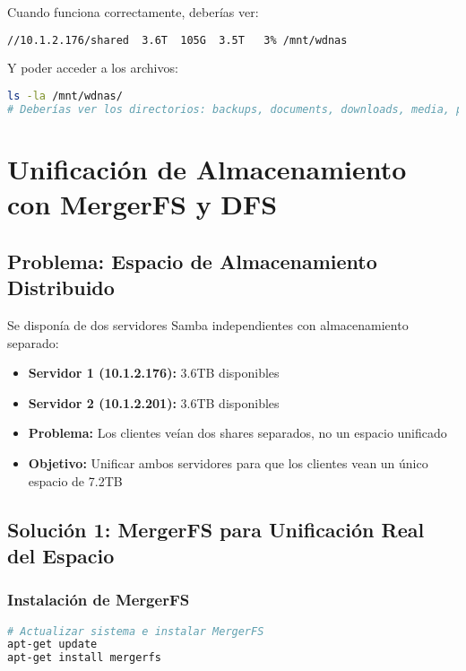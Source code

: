 \documentclass[12pt, a4paper]{article}
\begin{document}
Cuando funciona correctamente, deberías ver:
\begin{lstlisting}[language=bash, caption=Salida exitosa del montaje]
//10.1.2.176/shared  3.6T  105G  3.5T   3% /mnt/wdnas
\end{lstlisting}

Y poder acceder a los archivos:
\begin{lstlisting}[language=bash, caption=Contenido del share montado]
ls -la /mnt/wdnas/
# Deberías ver los directorios: backups, documents, downloads, media, public, etc.
\end{lstlisting}

\clearpage

\section{Unificación de Almacenamiento con MergerFS y DFS}
\label{sec:unificacion_almacenamiento}

\subsection{Problema: Espacio de Almacenamiento Distribuido}
\label{subsec:problema_almacenamiento_distribuido}

Se disponía de dos servidores Samba independientes con almacenamiento separado:

\begin{itemize}
    \item \textbf{Servidor 1 (10.1.2.176):} 3.6TB disponibles
    \item \textbf{Servidor 2 (10.1.2.201):} 3.6TB disponibles  
    \item \textbf{Problema:} Los clientes veían dos shares separados, no un espacio unificado
    \item \textbf{Objetivo:} Unificar ambos servidores para que los clientes vean un único espacio de 7.2TB
\end{itemize}

\subsection{Solución 1: MergerFS para Unificación Real del Espacio}
\label{subsec:solucion_mergerfs}

\subsubsection{Instalación de MergerFS}
\begin{lstlisting}[language=bash, caption=Instalación de MergerFS en Servidor 1]
# Actualizar sistema e instalar MergerFS
apt-get update
apt-get install mergerfs
\end{lstlisting}
\end{document}
